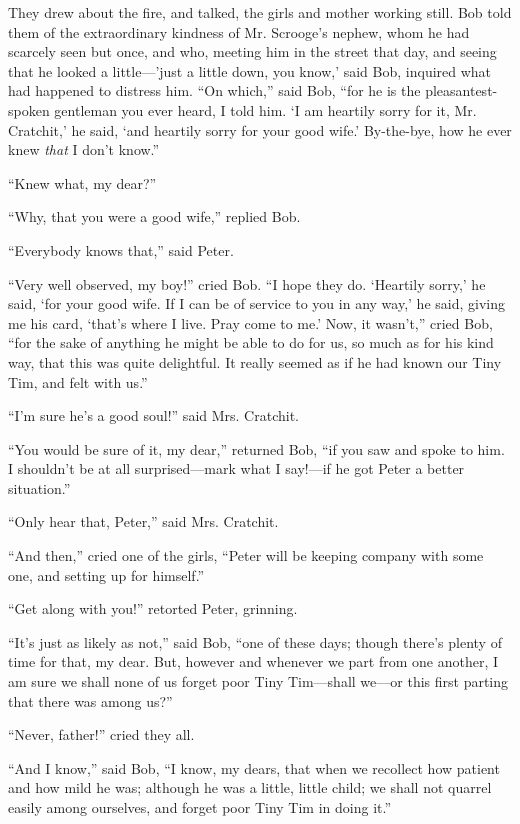 \documentclass[paper=5.5in:8.5in,BCOR=15mm,twoside,DIV=15,headinclude=off,12pt,chapterprefix=off,openany,headings=huge]{scrbook} %
\begin{document}
They drew about the fire, and talked, the girls and mother working still. Bob told them of the extraordinary kindness of Mr. Scrooge's nephew, whom he had scarcely seen but once, and who, meeting him in the street that day, and seeing that he looked a little—'just a little down, you know,' said Bob, inquired what had happened to distress him. \enquote{On which,} said Bob, \enquote{for he is the pleasantest-spoken gentleman you ever heard, I told him. \enquote{I am heartily sorry for it, Mr. Cratchit,} he said, \enquote{and heartily sorry for your good wife.} By-the-bye, how he ever knew \textit{that} I don't know.}

\enquote{Knew what, my dear?}

\enquote{Why, that you were a good wife,} replied Bob.

\enquote{Everybody knows that,} said Peter.

\enquote{Very well observed, my boy!} cried Bob. \enquote{I hope they do. \enquote{Heartily sorry,} he said, \enquote{for your good wife. If I can be of service to you in any way,} he said, giving me his card, \enquote{that's where I live. Pray come to me.} Now, it wasn't,} cried Bob, \enquote{for the sake of anything he might be able to do for us, so much as for his kind way, that this was quite delightful. It really seemed as if he had known our Tiny Tim, and felt with us.}

\enquote{I'm sure he's a good soul!} said Mrs. Cratchit.

\enquote{You would be sure of it, my dear,} returned Bob, \enquote{if you saw and spoke to him. I shouldn't be at all surprised—mark what I say!—if he got Peter a better situation.}

\enquote{Only hear that, Peter,} said Mrs. Cratchit.

\enquote{And then,} cried one of the girls, \enquote{Peter will be keeping company with some one, and setting up for himself.}

\enquote{Get along with you!} retorted Peter, grinning.

\enquote{It's just as likely as not,} said Bob, \enquote{one of these days; though there's plenty of time for that, my dear. But, however and whenever we part from one another, I am sure we shall none of us forget poor Tiny Tim—shall we—or this first parting that there was among us?}

\enquote{Never, father!} cried they all.

\enquote{And I know,} said Bob, \enquote{I know, my dears, that when we recollect how patient and how mild he was; although he was a little, little child; we shall not quarrel easily among ourselves, and forget poor Tiny Tim in doing it.}
\end{document}
